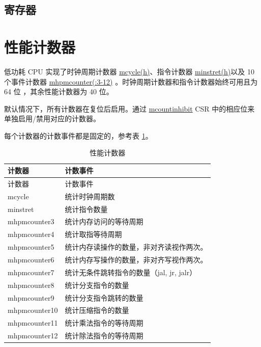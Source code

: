 \documentclass[main\_\_CN.tex]{subfiles}
\begin{document}
\subsection{寄存器}



\section{性能计数器}

低功耗 CPU 实现了时钟周期计数器 \hyperref[regdesc:LPMCYCLEH]{mcycle(h)}、指令计数器 \hyperref[regdesc:LPMINSTRETH]{minstret(h)}以及 10 个事件计数器 \hyperref[regdesc:LPMHPMCOUNTER]{mhpmcounter(:3-12)} 。时钟周期计数器和指令计数器始终可用且为 64 位 ，其余性能计数器为 40 位。

默认情况下，所有计数器在复位后启用。通过 \hyperref[regdesc:LPMCOUNTINHIBIT]{mcountinhibit} CSR 中的相应位来单独启用/禁用对应的计数器。

每个计数器的计数事件都是固定的，参考表 \ref{tab:ulp-pccr}。

\begin{longtable}[c]{|l|l|}
    \caption{性能计数器}\label{tab:ulp-pccr}\\\hline
    \rowcolor{lightgray}
    计数器 & 计数事件 \\\hline
    \endfirsthead
    \hline
    \rowcolor{lightgray}
    计数器 & 计数事件 \\\hline
    \endhead
    \endfoot

    mcycle      & 统计时钟周期数  \\\hline
    minstret    & 统计指令数量 \\\hline
    mhpmcounter3 & 统计内存访问的等待周期  \\\hline
    mhpmcounter4 & 统计取指等待周期 \\\hline
    mhpmcounter5 &  统计内存读操作的数量，非对齐读视作两次。  \\\hline

    mhpmcounter6 & 统计内存写操作的数量，非对齐写视作两次。 \\\hline
    mhpmcounter7 & 统计无条件跳转指令的数量（jal, jr, jalr） \\\hline
    mhpmcounter8 & 统计分支指令的数量 \\\hline
    mhpmcounter9 & 统计分支指令跳转的数量  \\\hline
    mhpmcounter10 & 统计压缩指令的数量  \\\hline
    mhpmcounter11 & 统计乘法指令的等待周期  \\\hline
    mhpmcounter12 & 统计除法指令的等待周期  \\\hline

\end{longtable}
\end{document}
